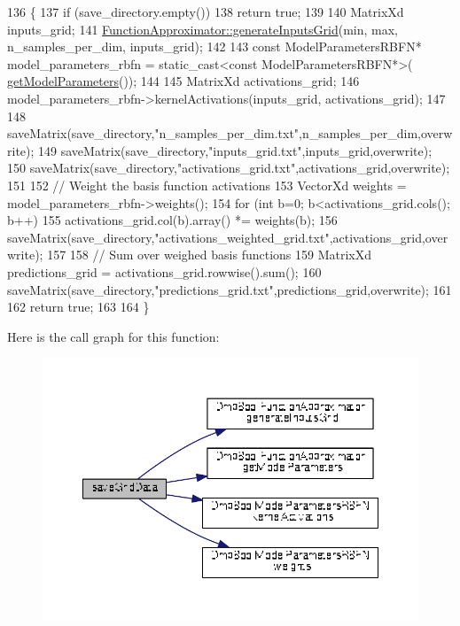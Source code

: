 \begin{DoxyCode}
136 \{
137   \textcolor{keywordflow}{if} (save\_directory.empty())
138     \textcolor{keywordflow}{return} \textcolor{keyword}{true};
139   
140   MatrixXd inputs\_grid;
141   \hyperlink{classDmpBbo_1_1FunctionApproximator_a61da4383ffab7d919c98d628c1d217d1}{FunctionApproximator::generateInputsGrid}(min, max, 
      n\_samples\_per\_dim, inputs\_grid);
142       
143   \textcolor{keyword}{const} ModelParametersRBFN* model\_parameters\_rbfn = \textcolor{keyword}{static\_cast<}\textcolor{keyword}{const }ModelParametersRBFN*\textcolor{keyword}{>}(
      \hyperlink{classDmpBbo_1_1FunctionApproximator_a0e7e116ed9b159d782fca544dacb4bac}{getModelParameters}());
144   
145   MatrixXd activations\_grid;
146   model\_parameters\_rbfn->kernelActivations(inputs\_grid, activations\_grid);
147   
148   saveMatrix(save\_directory,\textcolor{stringliteral}{"n\_samples\_per\_dim.txt"},n\_samples\_per\_dim,overwrite);
149   saveMatrix(save\_directory,\textcolor{stringliteral}{"inputs\_grid.txt"},inputs\_grid,overwrite);
150   saveMatrix(save\_directory,\textcolor{stringliteral}{"activations\_grid.txt"},activations\_grid,overwrite);
151 
152   \textcolor{comment}{// Weight the basis function activations  }
153   VectorXd weights = model\_parameters\_rbfn->weights();
154   \textcolor{keywordflow}{for} (\textcolor{keywordtype}{int} b=0; b<activations\_grid.cols(); b++)
155     activations\_grid.col(b).array() *= weights(b);
156   saveMatrix(save\_directory,\textcolor{stringliteral}{"activations\_weighted\_grid.txt"},activations\_grid,overwrite);
157   
158   \textcolor{comment}{// Sum over weighed basis functions}
159   MatrixXd predictions\_grid = activations\_grid.rowwise().sum();
160   saveMatrix(save\_directory,\textcolor{stringliteral}{"predictions\_grid.txt"},predictions\_grid,overwrite);
161   
162   \textcolor{keywordflow}{return} \textcolor{keyword}{true};
163   
164 \}
\end{DoxyCode}


Here is the call graph for this function\+:
\nopagebreak
\begin{figure}[H]
\begin{center}
\leavevmode
\includegraphics[width=350pt]{classDmpBbo_1_1FunctionApproximatorRBFN_a53d95f63de3b49491b1204f45a24ae25_cgraph}
\end{center}
\end{figure}




